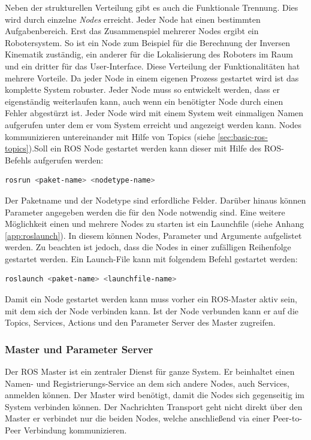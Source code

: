 Neben der strukturellen Verteilung gibt es auch die Funktionale Trennung. Dies wird durch einzelne \textit{Nodes} erreicht. Jeder Node hat einen bestimmten Aufgabenbereich. Erst das Zusammenspiel mehrerer Nodes ergibt ein Robotersystem. So ist ein Node zum Beispiel für die Berechnung der Inversen Kinematik zuständig, ein anderer für die Lokalisierung des Roboters im Raum und ein dritter für das User-Interface. Diese Verteilung der Funktionalitäten hat mehrere Vorteile. Da jeder Node in einem eigenen Prozess gestartet wird ist das komplette System robuster. Jeder Node muss so entwickelt werden, dass er eigenständig weiterlaufen kann, auch wenn ein benötigter Node durch einen Fehler abgestürzt ist. Jeder Node wird mit einem System weit einmaligen Namen aufgerufen unter dem er vom System erreicht und angezeigt werden kann. Nodes kommunizieren untereinander mit Hilfe von Topics (siehe \ref{sec:basic-ros-topics}).Soll ein ROS Node gestartet werden kann dieser mit Hilfe des ROS-Befehls aufgerufen werden:

\begin{lstlisting}[language=bash]
rosrun <paket-name> <nodetype-name>
\end{lstlisting}

Der Paketname und der Nodetype sind erfordliche Felder. Darüber hinaus können Parameter angegeben werden die für den Node notwendig sind. Eine weitere Möglichkeit einen und mehrere Nodes zu starten ist ein Launchfile (siehe Anhang \ref{app:roslaunch}). In diesem können Nodes, Parameter und Argumente aufgelistet werden. Zu beachten ist jedoch, dass die Nodes in einer zufälligen Reihenfolge gestartet werden. Ein Launch-File kann mit folgendem Befehl gestartet werden:

\begin{lstlisting}[language=bash]
roslaunch <paket-name> <launchfile-name>
\end{lstlisting}

Damit ein Node gestartet werden kann muss vorher ein ROS-Master aktiv sein, mit dem sich der Node verbinden kann. Ist der Node verbunden kann er auf die Topics, Services, Actions und den Parameter Server des Master zugreifen.

\subsubsection{Master und Parameter Server}
Der ROS Master ist ein zentraler Dienst für ganze System. Er beinhaltet einen Namen- und Registrierungs-Service an dem sich andere Nodes, auch Services, anmelden können. Der Master wird benötigt, damit die Nodes sich gegenseitig im System verbinden können. Der Nachrichten Transport geht nicht direkt über den Master er verbindet nur die beiden Nodes, welche anschließend via einer Peer-to-Peer Verbindung kommunizieren.

